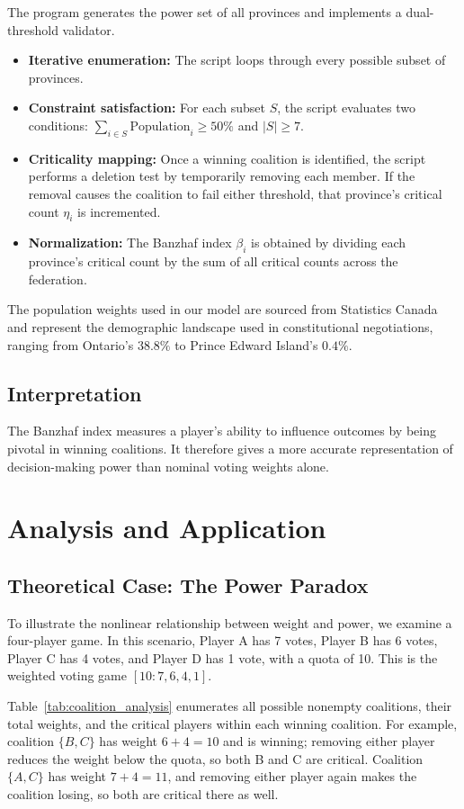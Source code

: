 \documentclass[lettersize,journal]{IEEEtran}
\begin{document}
The program generates the power set of all provinces and implements a dual-threshold validator.
\begin{itemize}
    \item \textbf{Iterative enumeration:} The script loops through every possible subset of provinces.
    \item \textbf{Constraint satisfaction:} For each subset $S$, the script evaluates two conditions: $\sum_{i\in S} \text{Population}_i \ge 50\%$ and $|S|\ge 7$.
    \item \textbf{Criticality mapping:} Once a winning coalition is identified, the script performs a deletion test by temporarily removing each member. If the removal causes the coalition to fail either threshold, that province's critical count $\eta_i$ is incremented.
    \item \textbf{Normalization:} The Banzhaf index $\beta_i$ is obtained by dividing each province's critical count by the sum of all critical counts across the federation.
\end{itemize}

The population weights used in our model are sourced from Statistics Canada and represent the demographic landscape used in constitutional negotiations, ranging from Ontario's $38.8\%$ to Prince Edward Island's $0.4\%$.

\subsection{Interpretation}
The Banzhaf index measures a player's ability to influence outcomes by being pivotal in winning coalitions. It therefore gives a more accurate representation of decision-making power than nominal voting weights alone.

\section{Analysis and Application}
\subsection{Theoretical Case: The Power Paradox}
To illustrate the nonlinear relationship between weight and power, we examine a four-player game. In this scenario, Player A has 7 votes, Player B has 6 votes, Player C has 4 votes, and Player D has 1 vote, with a quota of 10. This is the weighted voting game $[10:7,6,4,1]$.

Table~\ref{tab:coalition_analysis} enumerates all possible nonempty coalitions, their total weights, and the critical players within each winning coalition. For example, coalition $\{B,C\}$ has weight $6+4=10$ and is winning; removing either player reduces the weight below the quota, so both B and C are critical. Coalition $\{A,C\}$ has weight $7+4=11$, and removing either player again makes the coalition losing, so both are critical there as well.
\end{document}

